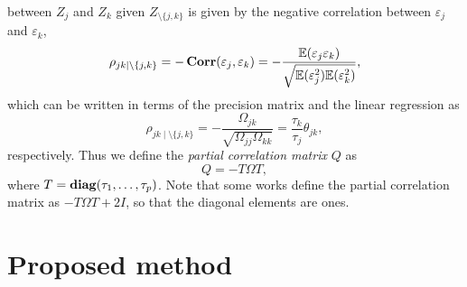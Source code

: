 \documentclass{article}
\begin{document}
between $Z_j$ and $Z_k$ given $Z_{\setminus \{j, k\}}$ is given by the negative
correlation between $\varepsilon_j$ and $\varepsilon_k$, 
\[
    \rho_{jk \mid \setminus\{j, k\}} = -\mathop{\bf Corr}(\varepsilon_j, \varepsilon_k) = -\frac{{\mathbb{E}}(\varepsilon_j \varepsilon_k)}{\sqrt{{\mathbb{E}}(\varepsilon_j^2) {\mathbb{E}}(\varepsilon_k^2)}},
\]
which can be written in terms of the precision matrix and the linear regression
as
\[
    \rho_{jk \mid \setminus\{j, k\}} = -\frac{\Omega_{jk}}{\sqrt{\Omega_{jj} \Omega_{kk}}} = \frac{\tau_k}{\tau_j} \theta_{jk},
\]
respectively. Thus we define the \emph{partial correlation matrix} $Q$ as
\[
    Q = - T \Omega T,
\]
where $T = \mathop{\bf diag}(\tau_1, \dots, \tau_p)$. Note that some works \citep{Schäfer04,
Marrelec06} define the partial correlation matrix as $-T \Omega T + 2I$, so that
the diagonal elements are ones. 

\section{Proposed method}
\end{document}
